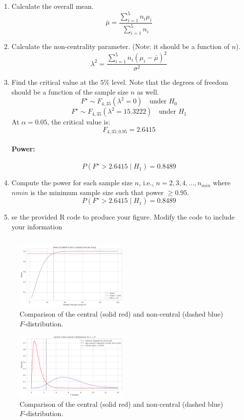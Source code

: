 \documentclass{article}
\begin{document}
\begin{enumerate}
	\item Calculate the overall mean.
	      \[
		      \bar{\mu} = \frac{\sum_{i=1}^{5} n_i \mu_i}{\sum_{i=1}^{5} n_i}
	      \]
	\item Calculate the non-centrality parameter. (Note: it should be a function of $n$).
	      \[
		      \lambda^2 = \frac{\sum_{i=1}^{5} n_i (\mu_i - \bar{\mu})^2}{\sigma^2}
	      \]
	\item Find the critical value at the $5\%$ level. Note that the degrees of freedom should be a function of the
	      sample size $n$ as well.
	      \[
		      F^\star \sim F_{4,35}(\lambda^2 = 0) \quad \text{under } H_0
	      \]
	      \[
		      F^\star \sim F_{4,35}(\lambda^2 = 15.3222) \quad \text{under } H_1
	      \]
	      At $\alpha = 0.05$, the critical value is:
	      \[
		      F_{4,35;0.95} = 2.6415
	      \]

	      \paragraph{Power:}
	      \[
		      P(F^\star > 2.6415 \mid H_1) = 0.8489
	      \]
	\item Compute the power for each sample size $n$, i.e., $n=2,3,4,\ldots,n_{min}$
	      where $n{min}$ is the minimum sample size such that power $\ge 0.95$.
	      \[
		      P(F^\star > 2.6415 \mid H_1) = 0.8489
	      \]

	\item se the provided R code to produce your figure. Modify the code to include your information
\end{enumerate}
\begin{pythonbox}
	\inputminted{python}{code/prob7.py}
\end{pythonbox}
\begin{figure}[H]
	\centering
	\includegraphics[width=0.5\textwidth]{assets/prob7a.png}
	\caption{Comparison of the central (solid red) and non-central (dashed blue) $F$-distribution.}
\end{figure}
\begin{figure}[H]
	\centering
	\includegraphics[width=0.5\textwidth]{assets/prob7b.png}
	\caption{Comparison of the central (solid red) and non-central (dashed blue) $F$-distribution.}
\end{figure}
\end{document}
